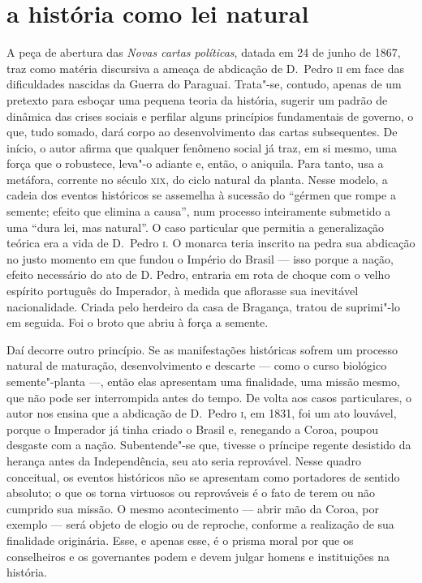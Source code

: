 \section{a história como lei natural}
A peça de abertura das \textit{Novas cartas políticas}, datada em 24
de junho de 1867, traz como matéria discursiva a ameaça de abdicação de
D.~Pedro \textsc{ii} em face das dificuldades nascidas da Guerra do Paraguai.
Trata"-se, contudo, apenas de um pretexto para esboçar uma pequena
teoria da história, sugerir um padrão de dinâmica das crises sociais e
perfilar alguns princípios fundamentais de governo, o que, tudo somado,
dará corpo ao desenvolvimento das cartas subsequentes. De início, o
autor afirma que qualquer fenômeno social já traz, em si mesmo, uma
força que o robustece, leva"-o adiante e, então, o aniquila. Para
tanto, usa a metáfora, corrente no século \textsc{xix}, 
do ciclo natural da planta. Nesse modelo, a cadeia
dos eventos históricos se assemelha à  sucessão do ``gérmen que rompe a
semente; efeito que elimina a causa'', num processo inteiramente
submetido a uma ``dura lei, mas natural''. O caso particular que permitia
a generalização teórica era a vida de D.~Pedro \textsc{i}. O monarca teria
inscrito na pedra sua abdicação no justo momento em que fundou o
Império do Brasil --- isso porque a nação, efeito necessário do ato de D.
Pedro, entraria em rota de choque com o velho espírito português do
Imperador, à  medida que aflorasse sua inevitável nacionalidade. Criada
pelo herdeiro da casa de Bragança, tratou de suprimi"-lo em seguida.
Foi o broto que abriu à  força a semente. 

Daí decorre outro princípio. Se as manifestações históricas sofrem um
processo natural de maturação, desenvolvimento e descarte --- como o
curso biológico semente"-planta ---, então elas apresentam uma
finalidade, uma missão mesmo, que não pode ser interrompida antes do
tempo. De volta aos casos particulares, o autor nos ensina que a
abdicação de D.~Pedro \textsc{i}, em 1831, foi um ato louvável, porque o
Imperador já tinha criado o Brasil e, renegando a Coroa, poupou
desgaste com a nação. Subentende"-se que, tivesse o príncipe regente
desistido da herança antes da Independência, seu ato seria reprovável.
Nesse quadro conceitual, os eventos históricos não se apresentam como
portadores de sentido absoluto; o que os torna virtuosos ou reprováveis
é o fato de terem ou não cumprido sua missão. O mesmo acontecimento ---
abrir mão da Coroa, por exemplo --- será objeto de elogio ou de
reproche, conforme a realização de sua finalidade originária. Esse, e
apenas esse, é o prisma moral por que os conselheiros e os governantes
podem e devem julgar homens e instituições na história.


